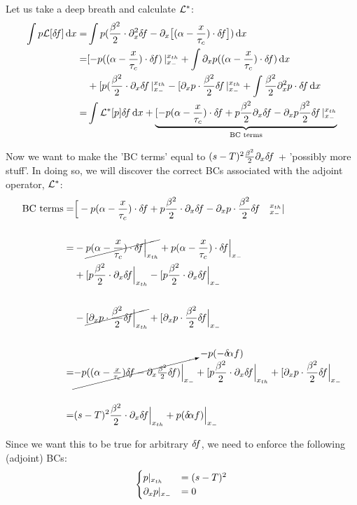 \documentclass{article}
\begin{document}
Let us take a deep breath and calculate ${ { \mathcal{L} }^* }$:
\begin{align*}
\int p \L [\df] \intd{x} =&
\int p (\frac{\b^2 }{2}\cdot \di^2_x \df -  
									\di_x \big[ (\a- \frac{x}{\tc})  \cdot \df \big]) \intd{x}
\\
=& [ -p ((\a- \frac{x}{\tc})  \cdot \df)\,\vert^\xth_\xmin
+ \int \di_xp ((\a- \frac{x}{\tc})  \cdot \df) \intd{x}
\\
& + [p (\frac{\b^2 }{2}\cdot \di_x \df \, \vert^\xth_\xmin 
- [ \di_x p \cdot \frac{\b^2 }{2}  \df\, \vert^\xth_\xmin 
+ \int \frac{\b^2 }{2} \di^2_xp    \cdot \df \intd{x} 
\\
=& \int \Lstar [p] \df \intd{x} 
+\underbrace{[-p(\a- \frac x \tc) \cdot \df 
+ p \frac{\b^2}{2} \di_x \df 
-\di_x p \frac{\b^2}{2} \df \, \vert^\xth_\xmin }_{\text{BC terms}}
\end{align*}

Now we want to make the 'BC terms' equal to $(s-T)^2 \frac{{\beta}^2}{2} {\partial}_x { \delta\! f}$
+ 'possibly more stuff'.
In doing so, we will discover the correct BCs associated with the adjoint
operator, ${ { \mathcal{L} }^* }$:
\begin{align*}
\textrm{BC terms} =& 
\Big[ -p (\a- \frac{x}{\tc})  \cdot \df 
+ p \frac{\b^2 }{2}\cdot \di_x \df   
- \di_x p \cdot \frac{\b^2 }{2}  \df   \quad ^\xth_\xmin\vert 
\\
\\
=& -\cancel{p (\a- \frac{x}{\tc})  \cdot \df \Big|_\xth}
 + p (\a- \frac{x}{\tc}) \cdot \df \Big|_\xmin
\\ 
& + [p \frac{\b^2 }{2}\cdot \di_x \df \Big|_\xth
 - [p \frac{\b^2 }{2}\cdot \di_x \df \Big|_\xmin
\\
\\
&- \cancel{[ \di_x p \cdot \frac{\b^2 }{2}   \df\Big|_\xth}
 + [ \di_x p \cdot \frac{\b^2 }{2}   \df\Big|_\xmin
\\
\\
=& \cancelto{-p (-\da f)}{-p ((\a- \tfrac x \tc)\df - \di_x \tfrac {\b^2}2
\df) \Big|_\xmin} 
+ [p \frac{\b^2 }{2}\cdot \di_x \df \Big|_\xth
+ [ \di_x p \cdot \frac{\b^2 }{2}   \df\Big|_\xmin
\\
\\
=& (s-T)^2 \frac{\b^2 }{2}\cdot \di_x \df\Big|_\xth 
+  p (\da f)\Big|_\xmin
\end{align*}

Since we want this to be true for arbitrary ${ \delta\! f}$, we need to enforce the
following (adjoint) BCs: 
$$
\begin{cases}
p |_{ x_{th} } &= (s-T)^2
\\
{\partial}_xp |_{ x_{-} } &= 0
\end{cases}
$$
\end{document}
